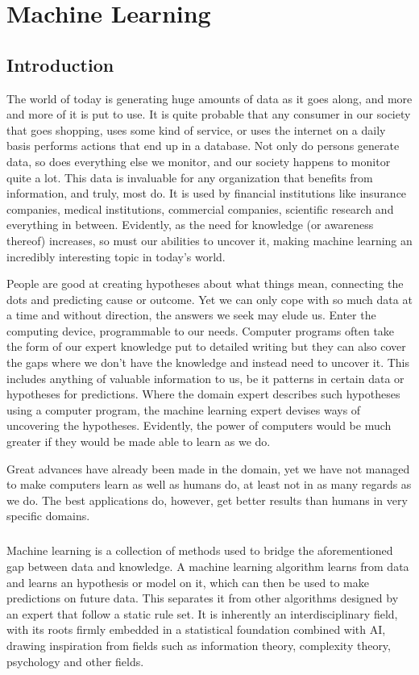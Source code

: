 \chapter{Machine Learning}

\section{Introduction}
The world of today is generating huge amounts of data
as it goes along,
and more and more of it is put to use.
It is quite probable that any consumer in our society
that goes shopping,
uses some kind of service,
or uses the internet
on a daily basis
performs actions that end up in a database.
Not only do persons generate data,
so does everything else we monitor,
and our society happens to monitor quite a lot.
This data is invaluable for any organization that benefits
from information,
and truly, most do.
It is used by financial institutions like insurance companies,
medical institutions, commercial companies, scientific research
and everything in between.
Evidently, as the need for knowledge (or awareness thereof)
increases, so must our abilities to uncover it,
making machine learning an incredibly interesting topic
in today's world.


People are good at creating hypotheses
about what things mean,
connecting the dots
and predicting cause or outcome.
Yet we can only cope
with so much data at a time
and without direction,
the answers we seek may elude us.
Enter the computing device,
programmable to our needs.
Computer programs often take the form
of our expert knowledge put to detailed writing
but they can also cover the gaps where
we don't have the knowledge
and instead need to uncover it.
This includes anything of valuable information to us,
be it patterns in certain data or hypotheses for predictions.
Where the domain expert describes such hypotheses
using a computer program,
the machine learning expert devises ways of uncovering
the hypotheses.
Evidently, the power of computers would be much greater
if they would be made able to learn as we do.

Great advances have already been made in the domain,
yet we have not managed to make computers learn
as well as humans do,
at least not in as many regards as we do.
The best applications do, however,
get better results than humans in very specific domains.


\paragraph{}
Machine learning is a collection of methods
used to bridge the aforementioned gap
between data and knowledge.
A machine learning algorithm learns from data
and learns an hypothesis or model on it,
which can then be used to make predictions on future data.
This separates it from other algorithms
designed by an expert
that follow a static rule set.
It is inherently an interdisciplinary field,
with its roots firmly embedded
in a statistical foundation
combined with AI,
drawing inspiration from fields such as
information theory,
complexity theory,
psychology
and other fields.

